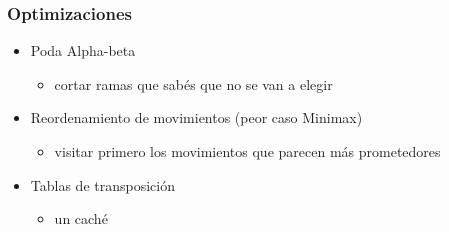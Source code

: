 
\begin{frame}
\frametitle{Optimizaciones}
\begin{itemize}
\item<1-> Poda Alpha-beta %
\begin{itemize}
    \item cortar ramas que sabés que no se van a elegir
\end{itemize}
\item<2-> Reordenamiento de movimientos (peor caso Minimax)
\begin{itemize}
\item visitar primero los movimientos que parecen más prometedores
\end{itemize}
\item<3-> Tablas de transposición
\begin{itemize}
    \item un caché
\end{itemize}
\end{itemize}
\end{frame}
